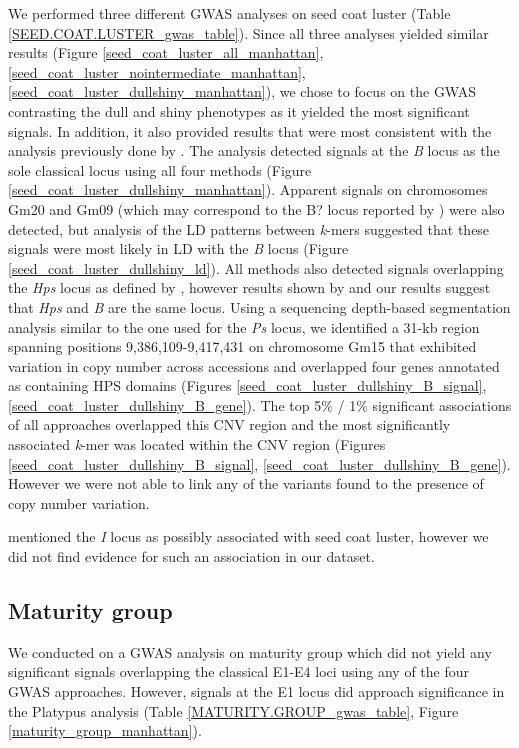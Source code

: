 We performed three different GWAS analyses on seed coat luster (Table
\ref{SEED.COAT.LUSTER_gwas_table}). Since all three analyses yielded similar results
(Figure \ref{seed_coat_luster_all_manhattan},
\ref{seed_coat_luster_nointermediate_manhattan},
\ref{seed_coat_luster_dullshiny_manhattan}), we chose to focus on the
GWAS contrasting the dull and shiny phenotypes as it yielded the most
significant signals. In addition, it also provided results that were most consistent with the
analysis previously done by \cite{bandillo2017}. The analysis detected
signals at the \emph{B} locus as the sole classical locus using all four
methods (Figure \ref{seed_coat_luster_dullshiny_manhattan}). Apparent signals
on chromosomes Gm20 and Gm09 (which may correspond to the B? locus reported by
\cite{bandillo2017}) were also detected, but analysis of the LD patterns
between \emph{k}-mers suggested that these signals were most likely in LD with
the \emph{B} locus (Figure \ref{seed_coat_luster_dullshiny_ld}). All methods
also detected signals overlapping the \emph{Hps} locus as defined by
\cite{bandillo2017}, however results shown by \cite{gijzen2003} and our results
suggest that \emph{Hps} and \emph{B} are the same locus. Using a sequencing depth-based segmentation analysis
similar to the one used for the \emph{Ps} locus, we identified a 31-kb region
spanning positions 9,386,109-9,417,431 on chromosome Gm15 that exhibited
variation in copy number across accessions and overlapped four genes annotated
as containing HPS domains (Figures \ref{seed_coat_luster_dullshiny_B_signal},
\ref{seed_coat_luster_dullshiny_B_gene}). The top 5\% / 1\% significant
associations of all approaches overlapped this CNV region and the
most significantly associated \emph{k}-mer was located within the CNV region
(Figures \ref{seed_coat_luster_dullshiny_B_signal},
\ref{seed_coat_luster_dullshiny_B_gene}). However we were not able to link any
of the variants found to the presence of copy number variation.


\cite{bandillo2017} mentioned the \textit{I} locus as possibly associated
with seed coat luster, however we did not find evidence for such an association
in our dataset.

\subsection*{Maturity group}
\label{sv-gwas-maturity-group}

We conducted on a GWAS analysis on maturity group which did not yield any significant signals
overlapping the classical E1-E4 loci using any of the four GWAS approaches.
However, signals at the E1 locus did approach significance in the Platypus
analysis (Table \ref{MATURITY.GROUP_gwas_table}, Figure \ref{maturity_group_manhattan}).

